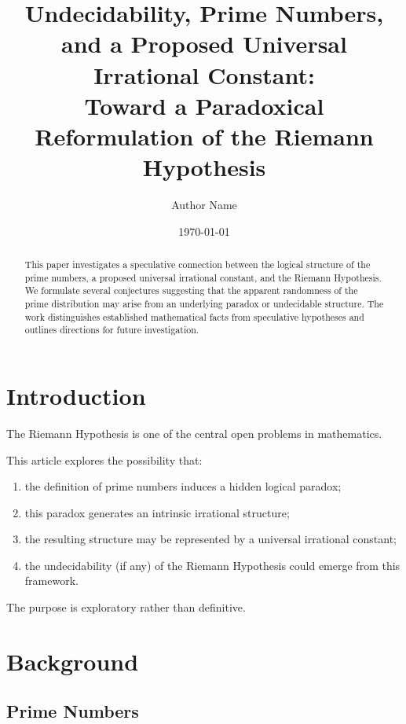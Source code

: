 \documentclass[11pt]{article}
\title{
Undecidability, Prime Numbers, and a Proposed Universal Irrational Constant:\\
Toward a Paradoxical Reformulation of the Riemann Hypothesis
}
\author{Author Name}
\date{\today}
\theoremstyle{definition}
\theoremstyle{remark}
\begin{document}
\maketitle

\begin{abstract}

This paper investigates a speculative connection between the logical structure of the prime numbers, a proposed universal irrational constant, and the Riemann Hypothesis. We formulate several conjectures suggesting that the apparent randomness of the prime distribution may arise from an underlying paradox or undecidable structure. The work distinguishes established mathematical facts from speculative hypotheses and outlines directions for future investigation.

\end{abstract}

\tableofcontents

\newpage

\section{Introduction}

The Riemann Hypothesis is one of the central open problems in mathematics.

This article explores the possibility that:

\begin{enumerate}
\item the definition of prime numbers induces a hidden logical paradox;
\item this paradox generates an intrinsic irrational structure;
\item the resulting structure may be represented by a universal irrational constant;
\item the undecidability (if any) of the Riemann Hypothesis could emerge from this framework.
\end{enumerate}

The purpose is exploratory rather than definitive.

\section{Background}

\subsection{Prime Numbers}
\end{document}

